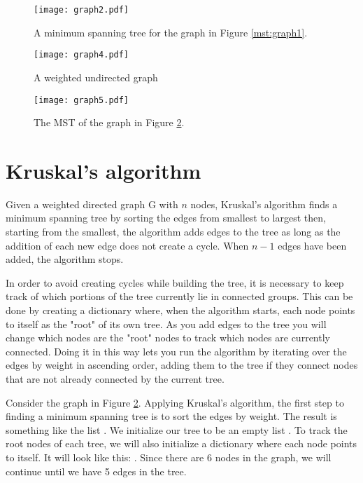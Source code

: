 \begin{figure}[H]
\texttt{[image: graph2.pdf]}
\caption{A minimum spanning tree for the graph in Figure \ref{mst:graph1}.}
\label{mst:graph2}
\end{figure}

\begin{figure}[H]
\texttt{[image: graph4.pdf]}
\caption{A weighted undirected graph}
\label{mst:graph4}
\end{figure}

\begin{figure}[H]
\texttt{[image: graph5.pdf]}
\caption{The MST of the graph in Figure \ref{mst:graph4}.}
\end{figure}

\section*{Kruskal's algorithm}

Given a weighted directed graph G with $n$ nodes, Kruskal's algorithm finds a minimum spanning tree by sorting the edges from smallest to largest then, starting from the smallest, the algorithm adds edges to the tree as long as the addition of each new edge does not create a cycle.
When $n-1$ edges have been added, the algorithm stops.

In order to avoid creating cycles while building the tree, it is necessary to keep track of which portions of the tree currently lie in connected groups.
This can be done by creating a dictionary where, when the algorithm starts, each node points to itself as the "root" of its own tree.
As you add edges to the tree you will change which nodes are the "root" nodes to track which nodes are currently connected.
Doing it in this way lets you run the algorithm by iterating over the edges by weight in ascending order, adding them to the tree if they connect nodes that are not already connected by the current tree.

Consider the graph in Figure \ref{mst:graph4}.
Applying Kruskal's algorithm, the first step to finding a minimum spanning tree is to sort the edges by weight.
The result is something like the list \li{[(C, D, 1), (C, E, 1), (D, E, 2), (A, B, 3), (B, F, 4), (E, F, 4), (B, C, 5), (C, F, 5), (A, F, 6)]}.
We initialize our tree to be an empty list \li{[]}.
To track the root nodes of each tree, we will also initialize a dictionary where each node points to itself.
It will look like this: .
Since there are 6 nodes in the graph, we will continue until we have 5 edges in the tree.

